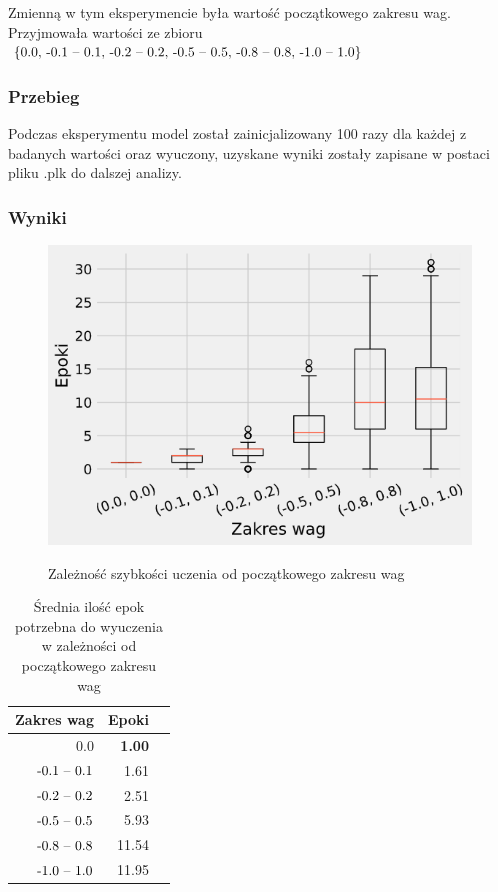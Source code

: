 \documentclass{article}
\begin{document}
Zmienną w tym eksperymencie była wartość początkowego zakresu wag. Przyjmowała wartości ze zbioru \(\{$0.0, -0.1 -- 0.1, -0.2 -- 0.2, -0.5 -- 0.5, -0.8 -- 0.8, -1.0 -- 1.0$\}\)

\subsubsection*{Przebieg}

Podczas eksperymentu model został zainicjalizowany 100 razy dla każdej z badanych wartości oraz wyuczony, uzyskane wyniki zostały zapisane w postaci pliku .plk do dalszej analizy.
\subsubsection*{Wyniki}

\begin{figure}[!h]
	\centering
	\caption{Zależność szybkości uczenia od początkowego zakresu wag}
	\includegraphics[width=.5\textwidth]{ada_w.png}
	\label{fig:res5}
\end{figure}

\begin{table}[!h]
	\caption{Średnia ilość epok potrzebna do wyuczenia w zależności od początkowego zakresu wag}
	\label{tabela-res-5}
	\centering
	\begin{tabular}{rrr}
		\toprule
		Zakres wag        & Epoki         \\
		\midrule
		0.0               & \textbf{1.00} \\
		\($-0.1 -- 0.1$\) & 1.61          \\
		\($-0.2 -- 0.2$\) & 2.51          \\
		\($-0.5 -- 0.5$\) & 5.93          \\
		\($-0.8 -- 0.8$\) & 11.54         \\
		\($-1.0 -- 1.0$\) & 11.95         \\
		\bottomrule
	\end{tabular}
\end{table}
\end{document}
